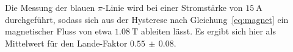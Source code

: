 %
Die Messung der blauen $\pi$-Linie wird bei einer Stromstärke von $\SI{15}{\ampere}$ durchgeführt, sodass sich aus der Hysterese nach Gleichung~\eqref{eq:magnet} ein magnetischer Fluss von etwa $\SI{1.08}{\tesla}$ ableiten lässt. Es ergibt sich hier als Mittelwert für den Lande-Faktor $0.55\,\pm\, 0.08$.
